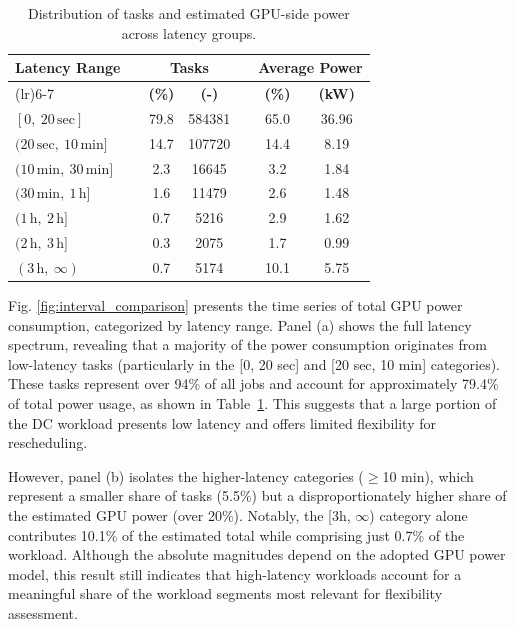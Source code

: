\documentclass[preprint,12pt]{elsarticle}
\begin{document}
\begin{table}[h!]
\centering
\renewcommand{\arraystretch}{1.3}
\begin{tabular}{@{} >{\centering\arraybackslash}m{4cm} c cc c cc @{}}
\toprule
\textbf{Latency Range} 
& & \multicolumn{2}{c}{\textbf{Tasks}} 
& \multicolumn{1}{c}{} 
& \multicolumn{2}{c}{\textbf{Average Power}} \\
\cmidrule(lr){3-4} \cmidrule(lr){6-7}
 & & \textbf{(\%)} & \textbf{(-)} 
 & & \textbf{(\%)} & \textbf{(kW)} \\
\midrule
\textit{$[0,\ 20\,\mathrm{sec}]$}  & & 79.8 & 584381 & & 65.0 & 36.96 \\
\textit{$(20\,\mathrm{sec},\ 10\,\mathrm{min}]$}  & & 14.7 & 107720 & & 14.4 & 8.19 \\
\textit{$(10\,\mathrm{min},\ 30\,\mathrm{min}]$} & & 2.3 & 16645 & & 3.2 & 1.84 \\
\textit{$(30\,\mathrm{min},\ 1\,\mathrm{h}]$} & & 1.6 & 11479 & & 2.6 & 1.48 \\
\textit{$(1\,\mathrm{h},\ 2\,\mathrm{h}]$} & & 0.7 & 5216 & & 2.9 & 1.62 \\
\textit{$(2\,\mathrm{h},\ 3\,\mathrm{h}]$} & & 0.3 & 2075 & & 1.7 & 0.99 \\
\textit{$(3\,\mathrm{h},\ \infty)$} & & 0.7 & 5174 & & 10.1 & 5.75 \\
\bottomrule
\end{tabular}
\caption{Distribution of tasks and estimated GPU-side power across latency groups.}
\label{tab:latency_distribution}
\end{table}


Fig. \ref{fig:interval_comparison} presents the time series of total GPU power consumption, categorized by latency range. Panel (a) shows the full latency spectrum, revealing that a majority of the power consumption originates from low-latency tasks (particularly in the [0, 20 sec] and [20 sec, 10 min] categories). These tasks represent over 94\% of all jobs and account for approximately 79.4\% of total power usage, as shown in Table~\ref{tab:latency_distribution}. This suggests that a large portion of the DC workload presents low latency and offers limited flexibility for rescheduling. 

However, panel (b) isolates the higher-latency categories ($\geq$10 min), which represent a smaller share of tasks (5.5\%) but a disproportionately higher share of the estimated GPU power (over 20\%). Notably, the [3h, $\infty$) category alone contributes 10.1\% of the estimated total while comprising just 0.7\% of the workload. Although the absolute magnitudes depend on the adopted GPU power model, this result still indicates that high-latency workloads account for a meaningful share of the workload segments most relevant for flexibility assessment.
\end{document}
